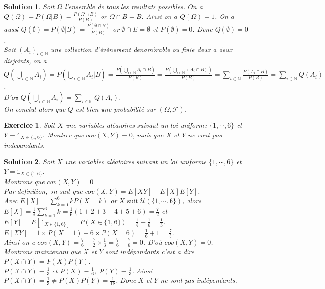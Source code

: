 \documentclass[a4paper, 12pt, french]{article}
\theoremstyle{break}
\newtheorem{exer}{Exercice}[section]
\newtheorem{sol}{Solution}[section]
\begin{document}
\begin{sol}
	Soit $\Omega$ l'ensemble de tous les resultats possibles. On a $Q(\Omega)=P(\Omega | B) = \frac{P(\Omega \cap B)}{P(B)}$ or $\Omega \cap B = B$. Ainsi on a $Q(\Omega)=1$. On a aussi $Q(\emptyset) = P(\emptyset | B) = \frac{P(\emptyset \cap B)}{P(B)}$ or $\emptyset \cap B = \emptyset$ et $P(\emptyset)=0$. Donc $Q(\emptyset)=0$.\\
	Soit $(A_{i})_{i \in \mathbb{N}}$ une collection d'évènement denombrable ou finie deux a deux disjoints, on a $Q(\bigcup_{i \in \mathbb{N}} A_{i})=P(\bigcup_{i \in \mathbb{N}} A_{i} | B) = \frac{P(\bigcup_{i \in \mathbb{N}} A_{i} \cap B)}{P(B)} = \frac{P(\bigcup_{i \in \mathbb{N}} (A_{i} \cap B))}{P(B)} = \sum_{i \in \mathbb{N}}\frac{P( A_{i} \cap B)}{P(B)} = \sum_{i \in \mathbb{N}} Q(A_{i})$. \\D'où $Q(\bigcup_{i \in \mathbb{N}} A_{i})=\sum_{i \in \mathbb{N}} Q(A_{i})$.\\
	On conclut alors que $Q$ est bien une probabilité sur $(\Omega, \mathcal{F})$. \marginpar{$\square$}
\end{sol}

\begin{exer}
	Soit $X$ une variables aléatoires suivant un loi uniforme $\{1, \cdots, 6\}$ et $Y = \mathds{1}_{X \in \{1,6\}}$. Montrer que $cov(X,Y)=0$, mais que $X$ et $Y$ ne sont pas indepandants.
\end{exer}

\begin{sol}
	Soit $X$ une variables aléatoires suivant un loi uniforme $\{1, \cdots, 6\}$ et $Y = \mathds{1}_{X \in \{1,6\}}$.\\
	Montrons que $cov(X,Y)=0$\\
	Par definition, on sait que $cov(X,Y) = E[XY] - E[X]E[Y]$.\\ Avec $E[X] = \sum_{k=1}^{6} k P(X=k)$ or $X \mbox{ suit } \mathcal{U}(\{1, \cdots, 6\})$, alors $E[X] = \frac{1}{6}\sum_{k=1}^{6} k = \frac{1}{6}(1+2+3+4+5+6) = \frac{7}{2}$ et $E[Y] = E[\mathds{1}_{X \in \{1,6\}}] = P(X \in \{1,6\}) = \frac{1}{6} + \frac{1}{6} = \frac{1}{3}$.\\
	$E[XY] = 1 \times P(X=1) + 6 \times P(X=6) = \frac{1}{6} + 1 = \frac{7}{6}$.\\ Ainsi on a $cov(X,Y) = \frac{7}{6} - \frac{7}{2} \times \frac{1}{3} = \frac{7}{6} - \frac{7}{6} = 0$. D'où $cov(X,Y)=0$.\\
	Montrons maintenant que $X$ et $Y$ sont indépandants c'est a dire $P(X \cap Y) = P(X)P(Y)$.\\ $P(X \cap Y) = \frac{1}{3}$ et $P(X)=\frac{1}{6}, \; P(Y)=\frac{1}{3}$. Ainsi $P(X \cap Y) = \frac{1}{3} \not= P(X)P(Y) = \frac{1}{18}$. Donc $X$ et $Y$ ne sont pas indépendants. \marginpar{$\square$}
\end{sol}
\end{document}

